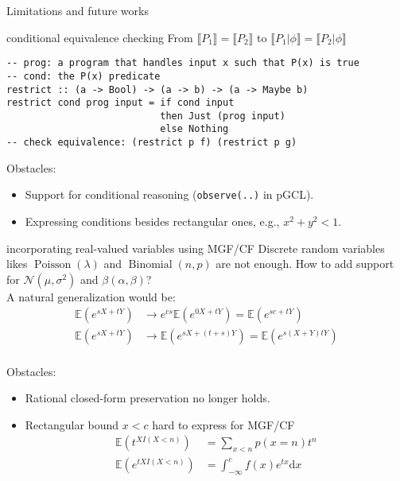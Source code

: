 \documentclass[8pt]{beamer}
\renewcommand{\S}[1]{ \llbracket #1 \rrbracket }
\newcommand{\E}{ \mathbb{E} }
\begin{document}
\begin{frame}{Limitations and future works}
	\begin{block}{conditional equivalence checking}
		From \(\S{P_1} = \S{P_2}\) to \(\S{P_1|\phi} = \S{P_2|\phi}\)
		\begin{verbatim}
-- prog: a program that handles input x such that P(x) is true
-- cond: the P(x) predicate
restrict :: (a -> Bool) -> (a -> b) -> (a -> Maybe b)
restrict cond prog input = if cond input
                           then Just (prog input)
                           else Nothing
-- check equivalence: (restrict p f) (restrict p g)
			\end{verbatim}

		Obstacles:
		\begin{itemize}
			\item Support for conditional reasoning (\texttt{observe(..)} in pGCL).
			\item Expressing conditions besides rectangular ones, e.g., \(x^2 + y^2 < 1\).
		\end{itemize}
	\end{block}

	\begin{block}{incorporating real-valued variables using MGF/CF}
		Discrete random variables likes \(\operatorname{Poisson}(\lambda)\) and \(\operatorname{Binomial}(n,p)\) are not enough.
		How to add support for \(\mathcal{N}(\mu,\sigma^2)\) and \(\beta(\alpha,\beta)\)?\\

		A natural generalization would be:
		\begin{align*}
			\E(e^{sX + tY}) & \to e^{cs} \E(e^{0X + tY}) = \E(e^{sc + tY}) \\
			\E(e^{sX + tY}) & \to \E(e^{sX + (t+s)Y}) = \E(e^{s(X+Y) tY}) \\
		\end{align*}

		Obstacles:
		\begin{itemize}
			\item Rational closed-form preservation no longer holds.
			\item Rectangular bound $x<c$ hard to express for MGF/CF
			      \begin{align*}
				      \E(t^{X I(X<n)})  & = \sum_{x<n} p(x=n) t^n                      \\
				      \E(e^{tX I(X<n)}) & = \int_{-\infty}^{c} f(x) e^{tx} \mathrm{d}x \\
			      \end{align*}
		\end{itemize}
	\end{block}


\end{frame}
\end{document}
